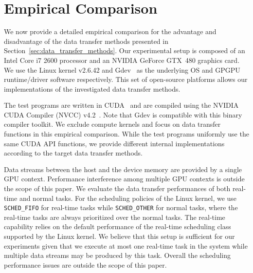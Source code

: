 \section{Empirical Comparison}
\label{sec:empirical_comparison}

We now provide a detailed empirical comparison for the advantage and
disadvantage of the data transfer methods presented in
Section~\ref{sec:data_transfer_methods}.
Our experimental setup is composed of an Intel Core i7 2600 processor
and an NVIDIA GeForce GTX~480 graphics card.
We use the Linux kernel v2.6.42 and Gdev~\cite{Kato_ATC12} as the
underlying OS and GPGPU runtime/driver software respectively.
This set of open-source platforms allows our implementations of the
investigated data transfer methods.

The test programs are written in CUDA~\cite{NVIDIA_CUDA} and are compiled
using the NVIDIA CUDA Compiler (NVCC) v4.2~\cite{NVIDIA_NVCC}.
Note that Gdev is compatible with this binary compiler toolkit.
We exclude compute kernels and focus on data transfer functions in this
empirical comparison.
While the test programs uniformly use the same CUDA API functions, we
provide different internal implementations according to the target data
transfer methods.

Data streams between the host and the device memory are provided by a
single GPU context.
Performance interference among multiple GPU contexts is outside the
scope of this paper.
We evaluate the data transfer performances of both real-time and normal
tasks.
For the scheduling policies of the Linux kernel, we use
\texttt{SCHED\_FIFO} for real-time tasks while \texttt{SCHED\_OTHER} for
normal tasks, where the real-time tasks are always prioritized over the
normal tasks.
The real-time capability relies on the default performance of the
real-time scheduling class supported by the Linux kernel.
We believe that this setup is sufficient for our experiments given that
we execute at most one real-time task in the system while multiple data
streams may be produced by this task.
Overall the scheduling performance issues are outside the scope of this
paper.

